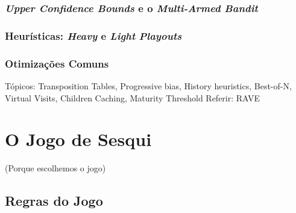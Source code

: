 \documentclass[12pt,a4paper,oneside]{article}
\begin{document}
\subsubsection{\textit{Upper Confidence Bounds} e o \textit{Multi-Armed Bandit}}

\lipsum[1]

\lipsum[2]

\subsubsection{Heurísticas: \textit{Heavy} e \textit{Light} \textit{Playouts}}

\lipsum[1]

\lipsum[2]

\subsubsection{Otimizações Comuns}
\label{sec:mcopt}


Tópicos: Transposition Tables, Progressive bias, History heuristics, Best-of-N, Virtual Visits, Children Caching, Maturity Threshold
Referir: RAVE

\lipsum[1]

\lipsum[2]

\lipsum[3]

\lipsum[4]

\lipsum[5]



\section{O Jogo de Sesqui}
\label{sec:sesqui}

(Porque escolhemos o jogo)

\lipsum[1]

\subsection{Regras do Jogo}

\lipsum[1]

\lipsum[2]

\lipsum[3]
\end{document}

